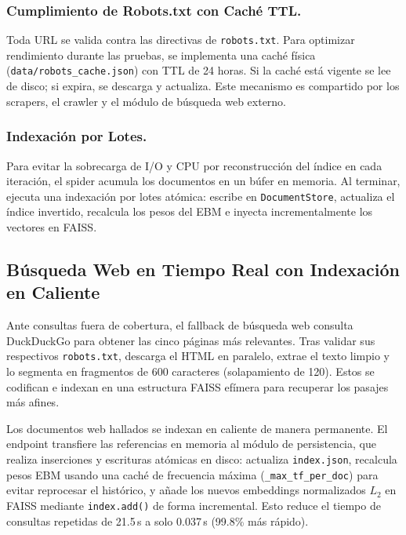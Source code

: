 \documentclass[10pt,a4paper]{llncs}
\begin{document}
\subsubsection{Cumplimiento de Robots.txt con Caché TTL.}

Toda URL se valida contra las directivas de \texttt{robots.txt}. Para optimizar rendimiento durante las pruebas, se implementa una caché física (\texttt{data/robots\_cache.json}) con TTL de 24 horas. Si la caché está vigente se lee de disco; si expira, se descarga y actualiza. Este mecanismo es compartido por los scrapers, el crawler y el módulo de búsqueda web externo.

\subsubsection{Indexación por Lotes.}

Para evitar la sobrecarga de I/O y CPU por reconstrucción del índice en cada iteración, el spider acumula los documentos en un búfer en memoria. Al terminar, ejecuta una indexación por lotes atómica: escribe en \texttt{DocumentStore}, actualiza el índice invertido, recalcula los pesos del EBM e inyecta incrementalmente los vectores en FAISS.

\subsection{Búsqueda Web en Tiempo Real con Indexación en Caliente}

Ante consultas fuera de cobertura, el fallback de búsqueda web consulta DuckDuckGo para obtener las cinco páginas más relevantes. Tras validar sus respectivos \texttt{robots.txt}, descarga el HTML en paralelo, extrae el texto limpio y lo segmenta en fragmentos de 600 caracteres (solapamiento de 120). Estos se codifican e indexan en una estructura FAISS efímera para recuperar los pasajes más afines.

Los documentos web hallados se indexan en caliente de manera permanente. El endpoint transfiere las referencias en memoria al módulo de persistencia, que realiza inserciones y escrituras atómicas en disco: actualiza \texttt{index.json}, recalcula pesos EBM usando una caché de frecuencia máxima (\texttt{\_max\_tf\_per\_doc}) para evitar reprocesar el histórico, y añade los nuevos embeddings normalizados $L_2$ en FAISS mediante \texttt{index.add()} de forma incremental. Esto reduce el tiempo de consultas repetidas de 21.5\,s a solo 0.037\,s (99.8\% más rápido).
\end{document}
